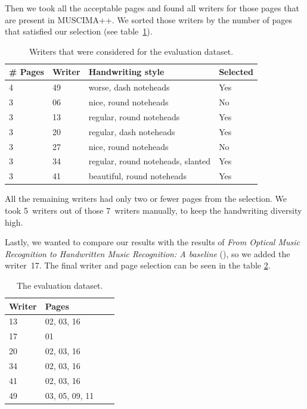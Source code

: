 Then we took all the acceptable pages and found all writers for those pages that are present in MUSCIMA++. We sorted those writers by the number of pages that satisfied our selection (see table~\ref{tab6:WritersConsideredForEvaluation}).

\begin{table}[h] \centering
\begin{tabular}{llll}
\toprule
\textbf{\# Pages} & \textbf{Writer} & \textbf{Handwriting style} &
\textbf{Selected} \\
\midrule
4 & 49 & worse, dash noteheads             & Yes \\
3 & 06 & nice, round noteheads             & No  \\
3 & 13 & regular, round noteheads          & Yes \\
3 & 20 & regular, dash noteheads           & Yes \\
3 & 27 & nice, round noteheads             & No  \\
3 & 34 & regular, round noteheads, slanted & Yes \\
3 & 41 & beautiful, round noteheads        & Yes \\
\bottomrule
\end{tabular}
\caption{Writers that were considered for the evaluation dataset.}
\label{tab6:WritersConsideredForEvaluation}
\end{table}

All the remaining writers had only two or fewer pages from the selection. We took 5~writers out of those 7~writers manually, to keep the handwriting diversity high.

Lastly, we wanted to compare our results with the results of \emph{From Optical Music Recognition to Handwritten Music Recognition: A baseline} (\cite{HmrBaseline}), so we added the writer~17. The final writer and page selection can be seen in the table \ref{tab6:EvaluationDataset}.

\begin{table}[h] \centering
\begin{tabular}{llll}
\toprule
\textbf{Writer} & \textbf{Pages} \\
\midrule
13 & 02, 03, 16     \\
17 & 01             \\
20 & 02, 03, 16     \\
34 & 02, 03, 16     \\
41 & 02, 03, 16     \\
49 & 03, 05, 09, 11 \\
\bottomrule
\end{tabular}
\caption{The evaluation dataset.}
\label{tab6:EvaluationDataset}
\end{table}

